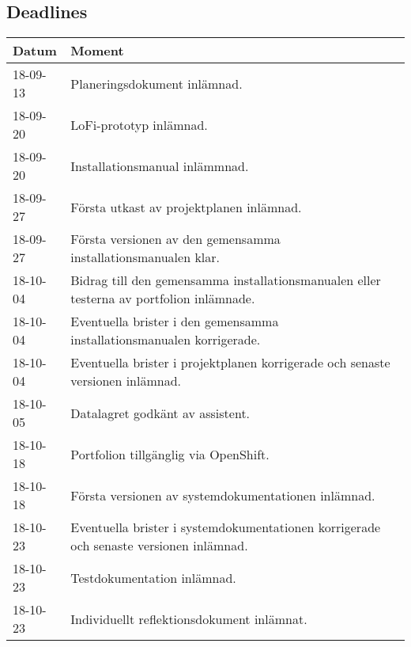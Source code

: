 \documentclass{TDP003mall}
\begin{document}
\subsection{Deadlines}
\begin{table}[!h]
\begin{tabularx}{\linewidth}{|l|X|}\hline
    \textbf{Datum} & \textbf{Moment} \\\hline
    18-09-13 & Planeringsdokument inlämnad. \\\hline
    18-09-20 & LoFi-prototyp inlämnad. \\\hline
    18-09-20 & Installationsmanual inlämmnad. \\\hline
    18-09-27 & Första utkast av projektplanen inlämnad. \\\hline
    18-09-27 & Första versionen av den gemensamma installationsmanualen klar. \\\hline
    18-10-04 & Bidrag till den gemensamma installationsmanualen eller testerna av portfolion inlämnade. \\\hline
    18-10-04 & Eventuella brister i den gemensamma installationsmanualen korrigerade. \\\hline
    18-10-04 & Eventuella brister i projektplanen korrigerade och senaste versionen inlämnad. \\\hline
    18-10-05 & Datalagret godkänt av assistent. \\\hline
    18-10-18 & Portfolion tillgänglig via OpenShift. \\\hline
    18-10-18 & Första versionen av systemdokumentationen inlämnad. \\\hline
    18-10-23 & Eventuella brister i systemdokumentationen korrigerade och senaste versionen inlämnad. \\\hline
    18-10-23 & Testdokumentation inlämnad. \\\hline
    18-10-23 & Individuellt reflektionsdokument inlämnat. \\\hline
\end{tabularx}
\end{table}
\newpage
\end{document}
